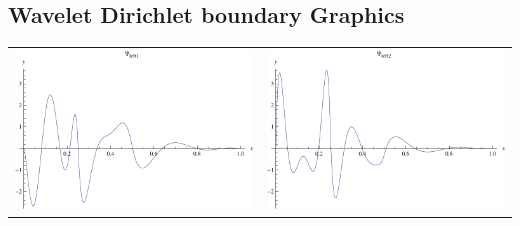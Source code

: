 \documentclass{article}
\begin{document}
\begin{landscape}
\subsection{Wavelet Dirichlet boundary Graphics}
\begin{tabular}{cc}
\includegraphics[width=10.cm]{sextic_wavelet_dleft_1.pdf}& \includegraphics[width=10.cm]{sextic_wavelet_dleft_2.pdf} \\
\end{tabular} 
 \\ 
\begin{tabular}{cc}

\end{tabular}
\end{landscape}
\end{document}
